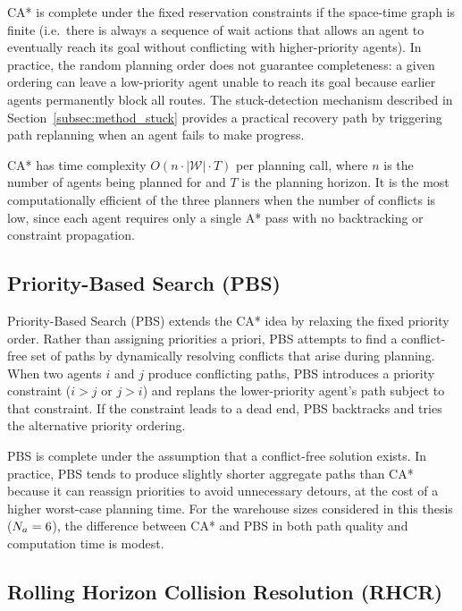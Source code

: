 CA* is complete under the fixed reservation constraints if the space-time graph
is finite (i.e.\ there is always a sequence of wait actions that allows an agent
to eventually reach its goal without conflicting with higher-priority agents).
In practice, the random planning order does not guarantee completeness: a given
ordering can leave a low-priority agent unable to reach its goal because earlier
agents permanently block all routes.
The stuck-detection mechanism described in
Section~\ref{subsec:method_stuck} provides a practical recovery path by
triggering path replanning when an agent fails to make progress.

CA* has time complexity $O(n \cdot |\mathcal{W}| \cdot T)$ per planning
call, where $n$ is the number of agents being planned for and $T$ is the
planning horizon.
It is the most computationally efficient of the three planners when the
number of conflicts is low, since each agent requires only a single A*
pass with no backtracking or constraint propagation.


\subsection{Priority-Based Search (PBS)}
\label{subsec:method_pbs}

Priority-Based Search (PBS) extends the CA* idea by relaxing the fixed
priority order.
Rather than assigning priorities a priori, PBS attempts to find a conflict-free
set of paths by dynamically resolving conflicts that arise during planning.
When two agents $i$ and $j$ produce conflicting paths, PBS introduces a
priority constraint ($i > j$ or $j > i$) and replans the lower-priority agent's
path subject to that constraint.
If the constraint leads to a dead end, PBS backtracks and tries the alternative
priority ordering.

PBS is complete under the assumption that a conflict-free solution exists.
In practice, PBS tends to produce slightly shorter aggregate paths than CA*
because it can reassign priorities to avoid unnecessary detours, at the cost of
a higher worst-case planning time.
For the warehouse sizes considered in this thesis ($N_a = 6$), the difference
between CA* and PBS in both path quality and computation time is modest.


\subsection{Rolling Horizon Collision Resolution (RHCR)}
\label{subsec:method_rhcr}

